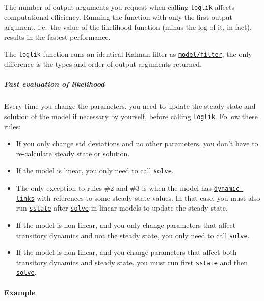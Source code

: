 The number of output arguments you request when calling \texttt{loglik}
affects computational efficiency. Running the function with only the
first output argument, i.e.~the value of the likelihood function (minus
the log of it, in fact), results in the fastest performance.

The \texttt{loglik} function runs an identical Kalman filter as
\href{model/filter}{\texttt{model/filter}}, the only difference is the
types and order of output arguments returned.

\subparagraph{Fast evaluation of
likelihood}\label{fast-evaluation-of-likelihood}

Every time you change the parameters, you need to update the steady
state and solution of the model if necessary by yourself, before calling
\texttt{loglik}. Follow these rules:

\begin{itemize}
\item
  If you only change std deviations and no other parameters, you don't
  have to re-calculate steady state or solution.
\item
  If the model is linear, you only need to call
  \href{model/solve}{\texttt{solve}}.
\item
  The only exception to rules \#2 and \#3 is when the model has
  \href{modellang/links}{\texttt{dynamic links}} with references to some
  steady state values. In that case, you must also run
  \href{model/sstate}{\texttt{sstate}} after
  \href{model/solve}{\texttt{solve}} in linear models to update the
  steady state.
\item
  If the model is non-linear, and you only change parameters that affect
  transitory dynamics and not the steady state, you only need to call
  \href{model/solve}{\texttt{solve}}.
\item
  If the model is non-linear, and you change parameters that affect both
  transitory dynamics and steady state, you must run first
  \href{model/sstate}{\texttt{sstate}} and then
  \href{model/solve}{\texttt{solve}}.
\end{itemize}

\paragraph{Example}\label{example}


